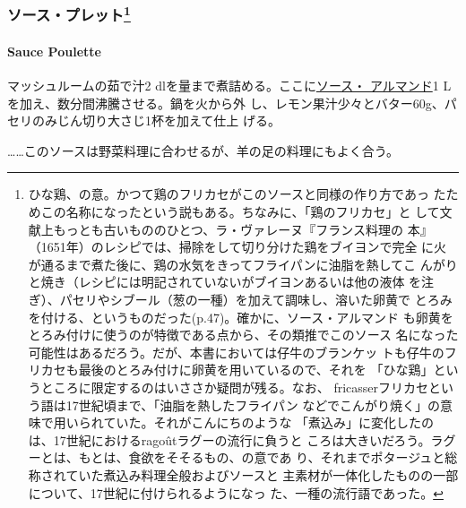 \begin{recette}
{\subsubsection[ソース・プレット]{\texorpdfstring{ソース・プレット\footnote{ひな鶏、の意。かつて鶏のフリカセがこのソースと同様の作り方であっ
  たためこの名称になったという説もある。ちなみに、「鶏のフリカセ」と
  して文献上もっとも古いもののひとつ、ラ・ヴァレーヌ『フランス料理の
  本』（1651年）のレシピでは、掃除をして切り分けた鶏をブイヨンで完全
  に火が通るまで煮た後に、鶏の水気をきってフライパンに油脂を熱してこ
  んがりと焼き（レシピには明記されていないがブイヨンあるいは他の液体
  を注ぎ）、パセリやシブール（葱の一種）を加えて調味し、溶いた卵黄で
  とろみを付ける、というものだった(p.47)。確かに、ソース・アルマンド
  も卵黄をとろみ付けに使うのが特徴である点から、その類推でこのソース
  名になった可能性はあるだろう。だが、本書においては仔牛のブランケッ
  トも仔牛のフリカセも最後のとろみ付けに卵黄を用いているので、それを
  「ひな鶏」というところに限定するのはいささか疑問が残る。なお、
  fricasserフリカセという語は17世紀頃まで、「油脂を熱したフライパン
  などでこんがり焼く」の意味で用いられていた。それがこんにちのような
  「煮込み」に変化したのは、17世紀におけるragoûtラグーの流行に負うと
  ころは大きいだろう。ラグーとは、もとは、食欲をそそるもの、の意であ
  り、それまでポタージュと総称されていた煮込み料理全般およびソースと
  主素材が一体化したものの一部について、17世紀に付けられるようになっ
  た、一種の流行語であった。}}{ソース・プレット}}\label{ux30bdux30fcux30b9ux30d7ux30ecux30c3ux30c8109}}

\hypertarget{sauce-poulette}{%
\paragraph{Sauce Poulette}\label{sauce-poulette}}


マッシュルームの茹で汁2
dlを\untiers{}量まで煮詰める。ここに\protect\hyperlink{sauce-allemande}{ソース・
アルマンド}1 Lを加え、数分間沸騰させる。鍋を火から外
し、レモン果汁少々とバター60g、パセリのみじん切り大さじ1杯を加えて仕上
げる。

\ldots{}\ldots{}このソースは野菜料理に合わせるが、羊の足の料理にもよく合う。

\maeaki

\hypertarget{ux30bdux30fcux30b9ux30e9ux30f4ux30a3ux30b4ux30c3ux30c8114}{%
}
\end{recette}
